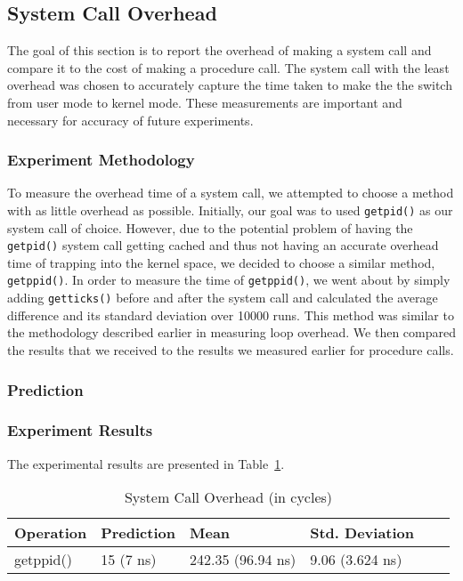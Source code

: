 \documentclass{article} %
\begin{document}
\subsection{System Call Overhead}
The goal of this section is to report the overhead of making a system call and
compare it to the cost of making a procedure call. The system call with the
least overhead was chosen to accurately capture the time taken to make the the
switch from user mode to kernel mode. These measurements are important and
necessary for accuracy of future experiments.

\subsubsection{Experiment Methodology}
To measure the overhead time of a system call, we attempted to choose a method
with as little overhead as possible. Initially, our goal was to used
\texttt{getpid()} as our system call of choice. However, due to the potential
problem of having the \texttt{getpid()} system call getting cached and thus
not having an accurate overhead time of trapping into the kernel space, we
decided to choose a similar method, \texttt{getppid()}. In order to measure
the time of \texttt{getppid()}, we went about by simply adding
\texttt{getticks()} before and after the system call and calculated the
average difference and its standard deviation over 10000 runs. This method was
similar to the methodology described earlier in measuring loop overhead. We
then compared the results that we received to the results we measured earlier
for procedure calls.

\subsubsection{Prediction}

\subsubsection{Experiment Results}
The experimental results are presented in Table~\ref{table:systemcall_overhead}.
\begin{table}
  \begin{center}
    \caption{System Call Overhead (in cycles)}
      \begin{tabular}{|l|l|l|l|l|l|}
        \hline
        Operation   & Prediction            & Mean                       & Std. Deviation     \\ \hline
        getppid()   & 15 (7 ns)             & 242.35 (96.94 ns)          & 9.06 (3.624 ns)    \\ \hline
      \end{tabular}
  \end{center}
\label{table:systemcall_overhead}
\end{table}
\end{document}
